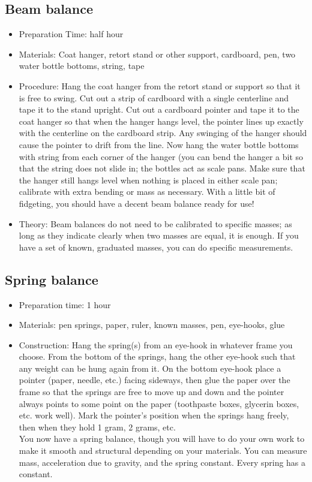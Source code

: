 \subsection{Beam balance}
\begin{itemize}
\item{Preparation Time: half hour}
\item{Materials: Coat hanger, retort stand or other support, cardboard, pen, two water bottle bottoms, string, tape}
\item{Procedure: Hang the coat hanger from the retort stand or support so that it is free to swing. Cut out a strip of cardboard with a single centerline and tape it to the stand upright. Cut out a cardboard pointer and tape it to the coat hanger so that when the hanger hangs level, the pointer lines up exactly with the centerline on the cardboard strip. Any swinging of the hanger should cause the pointer to drift from the line. Now hang the water bottle bottoms with string from each corner of the hanger (you can bend the hanger a bit so that the string does not slide in; the bottles act as scale pans. Make sure that the hanger still hangs level when nothing is placed in either scale pan; calibrate with extra bending or mass as necessary. With a little bit of fidgeting, you should have a decent beam balance ready for use!}
\item{Theory: Beam balances do not need to be calibrated to specific masses; as long as they indicate clearly when two masses are equal, it is enough. If you have a set of known, graduated masses, you can do specific measurements.}
\end{itemize}

\subsection{Spring balance}
\begin{itemize}
\item{Preparation time: 1 hour}
\item{Materials: pen springs, paper, ruler, known masses, pen, eye-hooks, glue}
\item{Construction: Hang the spring(s) from an eye-hook in whatever frame you choose. From the bottom of the springs, hang the other eye-hook such that any weight can be hung again from it. On the bottom eye-hook place a pointer (paper, needle, etc.) facing sideways, then glue the paper over the frame so that the springs are free to move up and down and the pointer always points to some point on the paper (toothpaste boxes, glycerin boxes, etc. work well). Mark the pointer’s position when the springs hang freely, then when they hold 1 gram, 2 grams, etc.\\
You now have a spring balance, though you will have to do your own work to make it smooth and structural depending on your materials. You can measure mass, acceleration due to gravity, and the spring constant. Every spring has a constant.}
\end{itemize}

